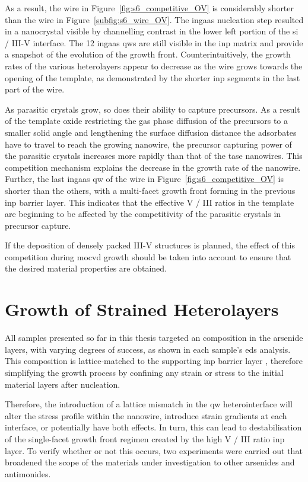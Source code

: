 As a result, the wire in Figure~\ref{fig:s6_competitive_OV} is considerably shorter than the wire in Figure~\ref{subfig:s6_wire_OV}. The \acs{ingaas} nucleation step resulted in a nanocrystal visible by channelling contrast in the lower left portion of the \acs{si} / III-V interface. The \num{12} \acs{ingaas} \acl{qw}s are still visible in the \acs{inp} matrix and provide a snapshot of the evolution of the growth front. Counterintuitively, the growth rates of the various heterolayers appear to decrease as the wire grows towards the opening of the template, as demonstrated by the shorter \acs{inp} segments in the last part of the wire. 

As parasitic crystals grow, so does their ability to capture precursors. As a result of the template oxide restricting the gas phase diffusion of the precursors to a smaller solid angle and lengthening the surface diffusion distance the adsorbates have to travel to reach the growing nanowire, the precursor capturing power of the parasitic crystals increases more rapidly than that of the \acs{tase} nanowires. This competition mechanism explains the decrease in the growth rate of the nanowire. Further, the last \acs{ingaas} \acl{qw} of the wire in Figure~\ref{fig:s6_competitive_OV} is shorter than the others, with a multi-facet growth front forming in the previous \acs{inp} barrier layer. This indicates that the effective V / III ratios in the template are beginning to be affected by the competitivity of the parasitic crystals in precursor capture.

If the deposition of densely packed III-V structures is planned, the effect of this competition during \acs{mocvd} growth should be taken into account to ensure that the desired material properties are obtained.

\section{Growth of Strained Heterolayers}

All samples presented so far in this thesis targeted an  composition in the arsenide layers, with varying degrees of success, as shown in each sample's \acs{eds} analysis. This composition is lattice-matched to the supporting \acs{inp} barrier layer \cite{Pearsall1980, Sugii1983, Wagner1970}, therefore simplifying the growth process by confining any strain or stress to the initial material layers after nucleation.

Therefore, the introduction of a lattice mismatch in the \acl{qw} heterointerface will alter the stress profile within the nanowire, introduce strain gradients at each interface, or potentially have both effects. In turn, this can lead to destabilisation of the  single-facet growth front regimen created by the high V / III ratio \acs{inp} layer. To verify whether or not this occurs, two experiments were carried out that broadened the scope of the materials under investigation to other arsenides and antimonides. 

